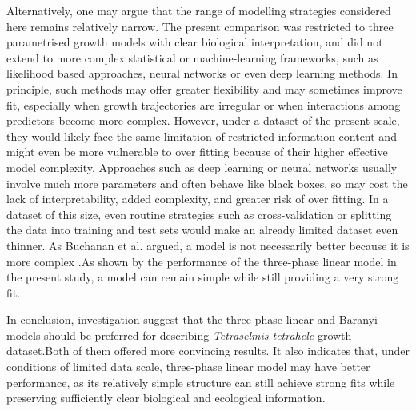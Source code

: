 \documentclass[11pt,onecolumn,draftclsnofoot]{IEEEtran}
\begin{document}
Alternatively, one may argue that the range of modelling strategies considered here remains relatively narrow. The present comparison was restricted to three parametrised growth models with clear biological interpretation, and did not extend to more complex statistical or machine-learning frameworks, such as likelihood based approaches, neural networks or even deep learning methods. In principle, such methods may offer greater flexibility and may sometimes improve fit, especially when growth trajectories are irregular or when interactions among predictors become more complex. However, under a dataset of the present scale, they would likely face the same limitation of restricted information content and might even be more vulnerable to over fitting because of their higher effective model complexity. Approaches such as deep learning or neural networks usually involve much more parameters and often behave like black boxes, so may cost the lack of interpretability, added complexity, and greater risk of over fitting. In a dataset of this size, even routine strategies such as cross-validation or splitting the data into training and test sets would make an already limited dataset even thinner. As Buchanan et al. argued, a model is not necessarily better because it is more complex \cite{BUCHANAN1997313}.As shown by the performance of the three-phase linear model in the present study, a model can remain simple while still providing a very strong fit.

In conclusion, investigation suggest that the three-phase linear and Baranyi models should be preferred for describing \textit{Tetraselmis tetrahele} growth dataset.Both of them offered more convincing results. It also indicates that, under conditions of limited data scale, three-phase linear model may have better performance, as its relatively simple structure can still achieve strong fits while preserving sufficiently clear biological and ecological information.
\newpage



\end{document}
